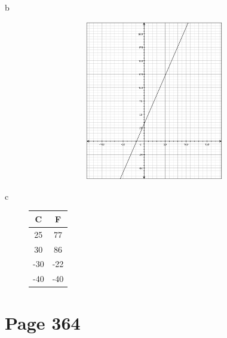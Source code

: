 \documentclass[fleqn,addpoints]{exam}
\begin{document}
\begin{description}
\begin{description}
\item[b]
\begin{figure}[H]
  \includegraphics[width=9cm,height=7cm]{p356/38}
\end{figure}

\item[c]
\begin{tabular}{| c | c |}
\hline
  C & F \\
\hline
\hline
  25 & 77 \\
  30 & 86 \\
  -30 & -22 \\
  -40 & -40 \\
\hline
\end{tabular}

\end{description} %
\end{description} %

\section{Page 364}
\end{document}
